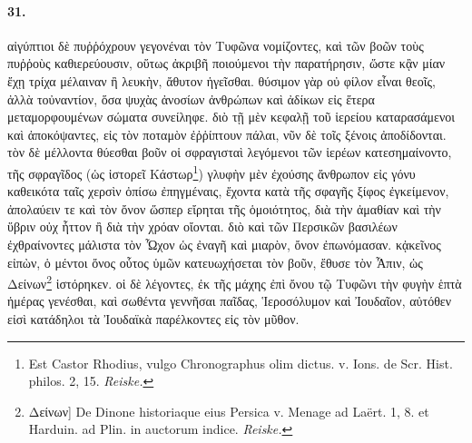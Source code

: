 \documentclass[a4paper, 11pt, oneside, polutonikogreek, german]{article}
\begin{document}
\paragraph{31.}
αἰγύπτιοι δὲ πυῤῥόχρουν γεγονέναι τὸν Τυφῶνα νομίζοντες, καὶ τῶν βοῶν τοὺς πυῤῥοὺς καθιερεύουσιν, οὕτως ἀκριβῆ ποιούμενοι τὴν παρατήρησιν, ὥστε κᾂν μίαν ἔχῃ τρίχα μέλαιναν ἢ λευκὴν, ἄθυτον ἡγεῖσθαι. θύσιμον γὰρ οὐ φίλον εἶναι θεοῖς, ἀλλὰ τοὐναντίον, ὅσα ψυχὰς ἀνοσίων ἀνθρώπων καὶ ἀδίκων εἰς ἕτερα μεταμορφουμένων σώματα συνείληφε. διὸ τῇ μὲν κεφαλῇ τοῦ ἱερείου καταρασάμενοι καὶ ἀποκόψαντες, εἰς τὸν ποταμὸν ἐῤῥίπτουν πάλαι, νῦν δὲ τοῖς ξένοις ἀποδίδονται. τὸν δὲ μέλλοντα θύεσθαι βοῦν οἱ σφραγισταὶ λεγόμενοι τῶν ἱερέων κατεσημαίνοντο, τῆς σφραγῖδος (ὡς ἱστορεῖ Κάστωρ\footnote{Est Castor Rhodius, vulgo Chronographus olim dictus. v. Ions. de Scr. Hist. philos. 2, 15. \emph{Reiske.}}) γλυφὴν μὲν ἐχούσης ἄνθρωπον εἰς γόνυ καθεικότα ταῖς χερσὶν ὀπίσω ἐπηγμέναις, ἔχοντα κατὰ τῆς σφαγῆς ξίφος ἐγκείμενον, ἀπολαύειν τε καὶ τὸν ὄνον ὥσπερ εἴρηται τῆς ὁμοιότητος, διὰ τὴν ἀμαθίαν καὶ τὴν ὕβριν οὐχ ἧττον ἢ διὰ τὴν χρόαν οἴονται. διὸ καὶ τῶν Περσικῶν βασιλέων ἐχθραίνοντες μάλιστα τὸν Ὦχον ὡς ἐναγῆ καὶ μιαρὸν, ὄνον ἐπωνόμασαν. κᾀκεῖνος εἰπὼν, ὁ μέντοι ὄνος οὗτος ὑμῶν κατευωχήσεται τὸν βοῦν, ἔθυσε τὸν Ἆπιν, ὡς Δείνων\footnote{Δείνων] De Dinone historiaque eius Persica v. Menage ad Laërt. 1, 8. et Harduin. ad Plin. in auctorum indice. \emph{Reiske.}} ἱστόρηκεν. οἱ δὲ λέγοντες, ἐκ τῆς μάχης ἐπὶ ὄνου τῷ Τυφῶνι τὴν φυγὴν ἑπτὰ ἡμέρας γενέσθαι, καὶ σωθέντα γεννῆσαι παῖδας, Ἱεροσόλυμον καὶ Ἰουδαῖον, αὐτόθεν εἰσὶ κατάδηλοι τὰ Ἰουδαϊκὰ παρέλκοντες εἰς τὸν μῦθον.
\end{document}
